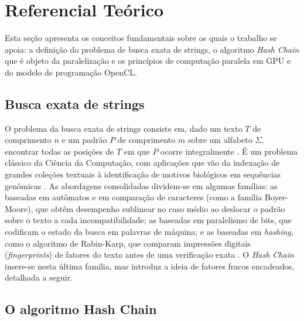 \documentclass[12pt]{article}
\begin{document}
\section{Referencial Teórico}

Esta seção apresenta os conceitos fundamentais sobre os quais o trabalho se apoia: a definição do problema de busca exata de strings, o algoritmo \textit{Hash Chain} que é objeto da paralelização e os princípios de computação paralela em GPU e do modelo de programação OpenCL.

\subsection{Busca exata de strings}

O problema da busca exata de strings consiste em, dado um texto $T$ de comprimento $n$ e um padrão $P$ de comprimento $m$ sobre um alfabeto $\Sigma$, encontrar todas as posições de $T$ em que $P$ ocorre integralmente \cite{gusfield1997}. É um problema clássico da Ciência da Computação, com aplicações que vão da indexação de grandes coleções textuais à identificação de motivos biológicos em sequências genômicas \cite{navarro2001}. As abordagens consolidadas dividem-se em algumas famílias: as baseadas em autômatos e em comparação de caracteres (como a família Boyer-Moore), que obtêm desempenho sublinear no caso médio ao deslocar o padrão sobre o texto a cada incompatibilidade; as baseadas em paralelismo de bits, que codificam o estado da busca em palavras de máquina; e as baseadas em \textit{hashing}, como o algoritmo de Rabin-Karp, que comparam impressões digitais (\textit{fingerprints}) de fatores do texto antes de uma verificação exata \cite{gusfield1997,navarro2001}. O \textit{Hash Chain} insere-se nesta última família, mas introduz a ideia de fatores fracos encadeados, detalhada a seguir.

\subsection{O algoritmo Hash Chain}
\end{document}
